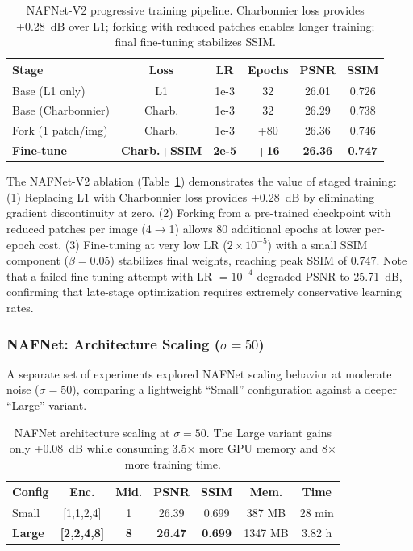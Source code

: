 \begin{table}[t]
\centering
\small
\setlength{\tabcolsep}{2.5pt}
\begin{tabular}{lccccc}
\toprule
\textbf{Stage} & \textbf{Loss} & \textbf{LR} & \textbf{Epochs} & \textbf{PSNR} & \textbf{SSIM} \\
\midrule
Base (L1 only) & L1 & 1e-3 & 32 & 26.01 & 0.726 \\
Base (Charbonnier) & Charb. & 1e-3 & 32 & 26.29 & 0.738 \\
Fork (1 patch/img) & Charb. & 1e-3 & +80 & 26.36 & 0.746 \\
\textbf{Fine-tune} & \textbf{Charb.+SSIM} & \textbf{2e-5} & \textbf{+16} & \textbf{26.36} & \textbf{0.747} \\
\bottomrule
\end{tabular}
\caption{NAFNet-V2 progressive training pipeline. Charbonnier loss provides +0.28~dB over L1; forking with reduced patches enables longer training; final fine-tuning stabilizes SSIM.}
\label{tab:nafnet_ablation}
\end{table}

The NAFNet-V2 ablation (Table~\ref{tab:nafnet_ablation}) demonstrates the value of staged training: (1) Replacing L1 with Charbonnier loss provides +0.28~dB by eliminating gradient discontinuity at zero. (2) Forking from a pre-trained checkpoint with reduced patches per image (4$\to$1) allows 80 additional epochs at lower per-epoch cost. (3) Fine-tuning at very low LR ($2 \times 10^{-5}$) with a small SSIM component ($\beta = 0.05$) stabilizes final weights, reaching peak SSIM of 0.747. Note that a failed fine-tuning attempt with LR $= 10^{-4}$ degraded PSNR to 25.71~dB, confirming that late-stage optimization requires extremely conservative learning rates.

\subsubsection{NAFNet: Architecture Scaling (\texorpdfstring{$\sigma = 50$}{sigma=50})}

A separate set of experiments explored NAFNet scaling behavior at moderate noise ($\sigma = 50$), comparing a lightweight ``Small'' configuration against a deeper ``Large'' variant.

\begin{table}[t]
\centering
\small
\setlength{\tabcolsep}{2.5pt}
\begin{tabular}{lcccccc}
\toprule
\textbf{Config} & \textbf{Enc.} & \textbf{Mid.} & \textbf{PSNR} & \textbf{SSIM} & \textbf{Mem.} & \textbf{Time} \\
\midrule
Small & [1,1,2,4] & 1 & 26.39 & 0.699 & 387 MB & 28 min \\
\textbf{Large} & \textbf{[2,2,4,8]} & \textbf{8} & \textbf{26.47} & \textbf{0.699} & 1347 MB & 3.82 h \\
\bottomrule
\end{tabular}
\caption{NAFNet architecture scaling at $\sigma = 50$. The Large variant gains only +0.08~dB while consuming 3.5$\times$ more GPU memory and 8$\times$ more training time.}
\label{tab:nafnet_scaling}
\end{table}

